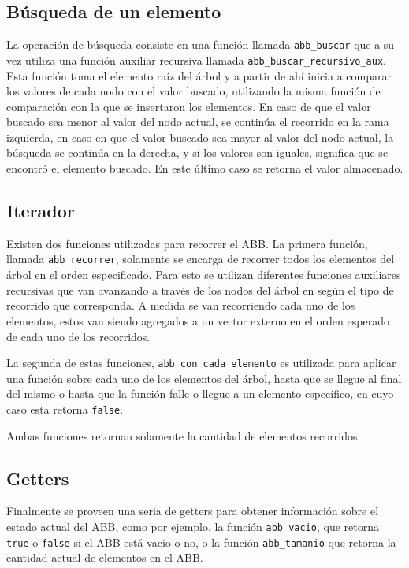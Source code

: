 \documentclass[titlepage,a4paper]{article}
\begin{document}
											\subsection{Búsqueda de un elemento}

La operación de búsqueda consiste en una función llamada \lstinline{abb_buscar}
que a su vez utiliza una función auxiliar recursiva llamada
\lstinline{abb_buscar_recursivo_aux}. Esta función toma el elemento raíz del
árbol y a partir de ahí inicia a comparar los valores de cada nodo con el
valor buscado, utilizando la misma función de comparación con la que se
insertaron los elementos. En caso de que el valor buscado sea menor al valor
del nodo actual, se continúa el recorrido en la rama izquierda, en caso en que
el valor buscado sea mayor al valor del nodo actual, la búsqueda se continúa en
la derecha, y si los valores son iguales, significa que se encontró el elemento
buscado. En este último caso se retorna el valor almacenado.


														 \subsection{Iterador}

Existen dos funciones utilizadas para recorrer el ABB. La primera función,
llamada \lstinline{abb_recorrer}, solamente se encarga de recorrer todos los
elementos del árbol en el orden especificado. Para esto se utilizan
diferentes funciones auxiliares recursivas que van avanzando a través de los
nodos del árbol en según el tipo de recorrido que corresponda. A medida se van
recorriendo cada uno de los elementos, estos van siendo agregados a un vector
externo en el orden esperado de cada uno de los recorridos.

La segunda de estas funciones, \lstinline{abb_con_cada_elemento} es utilizada
para aplicar una función sobre cada uno de los elementos del árbol, hasta que se
llegue al final del mismo o hasta que la función falle o llegue a un elemento
específico, en cuyo caso esta retorna \lstinline{false}.

Ambas funciones retornan solamente la cantidad de elementos recorridos.


															\subsection{Getters}

Finalmente se proveen una seria de getters para obtener información sobre el
estado actual del ABB, como por ejemplo, la función \lstinline{abb_vacio}, que 
retorna \lstinline{true} o \lstinline{false} si el ABB está vacío o no, o la
función \lstinline{abb_tamanio} que retorna la cantidad actual de elementos
en el ABB.
\end{document}
